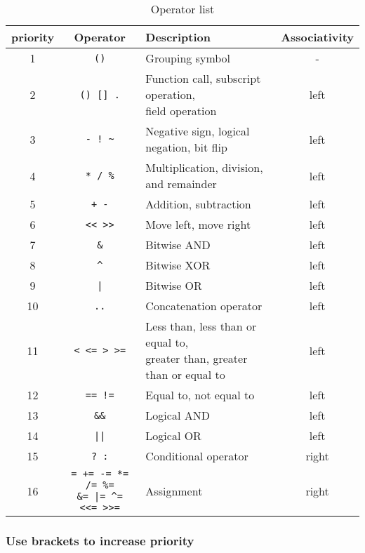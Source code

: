 \begin{table}[htb]
    \centering
    \setlength{\tabcolsep}{3mm}
    \begin{tabular}{cclc} \toprule
        \textbf{priority} & \textbf{Operator} & \textbf{Description} & \textbf{Associativity} \\ \midrule
        1 & \texttt{()} & Grouping symbol & - \\
        2 & \texttt{() [] .} & \makecell[l]{Function call, subscript operation, \\ field operation} & left \\
        3 & \texttt{- ! \textasciitilde} & Negative sign, logical negation, bit flip & left \\
        4 & \texttt{* / \%} & Multiplication, division, and remainder & left \\
        5 & \texttt{+ -} & Addition, subtraction & left \\
        6 & \texttt{<< >>} & Move left, move right & left \\
        7 & \texttt{\&} & Bitwise AND & left \\
        8 & \texttt{\textasciicircum} & Bitwise XOR & left \\
        9 & \texttt{|} & Bitwise OR & left \\
        10 & \texttt{..} & Concatenation operator & left \\
        11 & \texttt{< <= > >=} & \makecell[l]{Less than, less than or equal to, \\ greater than, greater than or equal to} & left \\
        12 & \texttt{== !=} & Equal to, not equal to & left \\
        13 & \texttt{\&\&} & Logical AND & left \\
        14 & \texttt{||} & Logical OR & left \\
        15 & \texttt{? :} & Conditional operator & right \\
        16 & \makecell{\texttt{= += -= *= /= \%=} \\
                       \texttt{\&= |= \textasciicircum= <<= >>=}} & Assignment & right \\
        \bottomrule
    \end{tabular}
    \caption{Operator list}
    \label{tab::operator_list}
\end{table}

\subsubsection {Use brackets to increase priority}

